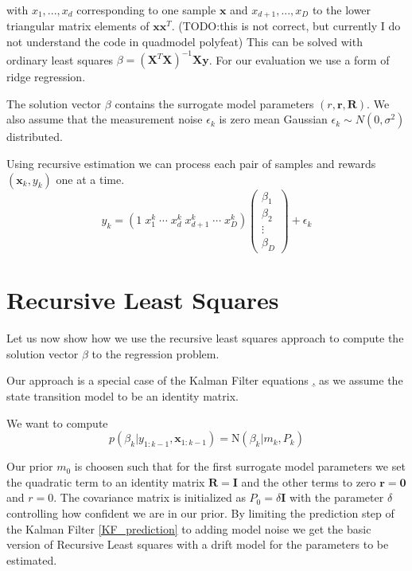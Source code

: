 with $x_1,...,x_d$ corresponding to one sample $\mathbf{x}$
and $x_{d+1},...,x_D$ to
the lower triangular matrix elements of
 $\mathbf{x} \mathbf{x}^T$.
(TODO:this is not correct, but currently I do not
understand the code in quadmodel polyfeat)
This can be solved with ordinary least squares
$\beta = (\mathbf{X}^T \mathbf{X})^{-1} \mathbf{X} \mathbf{y}$.
For our evaluation we use a form of ridge regression.



The solution vector $\beta$ contains the surrogate model parameters
$(r, \mathbf{r}, \mathbf{R})$. We also assume that
the measurement noise $\epsilon_k$ is zero mean Gaussian
$\epsilon_k \sim N(0, \sigma^2)$ distributed.

Using recursive estimation we
can process each pair of samples and rewards $(\mathbf{x}_k, y_k)$ one
at a time.
$$
 y_k =
 (1 \;  x_1^k \; \cdots
 \; x_d^k  \; x_{d+1}^k \; \cdots \;  x_{D}^k)
\begin{pmatrix}
  \beta_1 \\ \beta_2 \\ \vdots \\ \beta_D
\end{pmatrix} 
+ \epsilon_k
$$

\section{Recursive Least Squares}
Let us now show how we use the recursive least squares approach
to compute the solution vector $\beta$ to the regression problem.

Our approach is a special case of the Kalman Filter equations
\href{KF_update}, as we assume the state transition model to be
an identity matrix.

We want to compute
$$ p(\beta_k | y_{1:k-1}, \mathbf{x}_{1:k-1}) = \text{N}(\beta_k | m_k, P_k) $$

Our prior $m_0$ is choosen such that for the
first surrogate model parameters
we set the quadratic term to an identity matrix $\mathbf{R} = \mathbf{I}$
and the other terms to zero $ \mathbf{r} = \mathbf{0}$ and $ r = 0$.
The covariance matrix is initialized as  $P_0 = \delta \mathbf{I}$ with
the parameter $\delta$ controlling how confident
we are in our prior. By limiting the prediction step of the Kalman Filter
\cref{KF_prediction} to adding model noise we get the basic
version of Recursive Least squares  with a drift model for the
parameters to be estimated.

